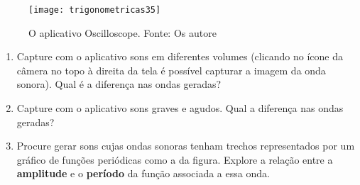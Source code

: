 \begin{knowledge}
\begin{figure}[H]
\centering

\texttt{[image: trigonometricas35]}
\caption{O aplicativo Oscilloscope. Fonte: Os autore}
\label{}
\end{figure}

\begin{enumerate}
\item Capture com o aplicativo sons em diferentes volumes (clicando no ícone da câmera no topo à direita da tela é possível capturar a imagem da onda sonora). Qual é a diferença nas ondas geradas?
\item Capture com o aplicativo sons graves e agudos. Qual a diferença nas ondas geradas?
\item Procure gerar sons cujas ondas sonoras tenham trechos representados por um gráfico de funções periódicas como a da figura. Explore a relação entre a \textbf{amplitude} e o \textbf{período} da função associada a essa onda.

\end{enumerate}

\end{knowledge}



